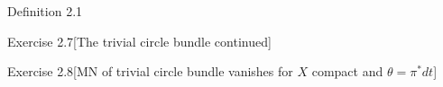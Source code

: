 \begin{thing3}{Definition 2.1}
\begin{thing4}{Exercise 2.7}[The trivial circle bundle continued]\label{exer:2.7}\leavevmode

\end{thing4}

\begin{thing4}{Exercise 2.8}[MN of trivial circle bundle vanishes for \(X\) compact and \(\theta=\pi^*dt\)]\label{exer:2.8}\leavevmode

\end{thing4}

\end{thing3}













